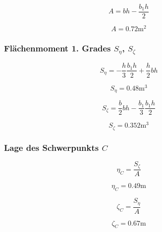 \documentclass[
  12pt,
  letterpaper,
  DIV=11,
  egregdoesnotlikesansseriftitles]{scrartcl}
\begin{document}
\begin{equation}A = b h - \frac{b_{1} h}{2}\end{equation}

\begin{equation}A = 0.72 \text{m}^{2}\end{equation}

\hypertarget{fluxe4chenmoment-1.-grades-s_eta-s_zeta}{%
\subsubsection{\texorpdfstring{Flächenmoment 1. Grades \(S_\eta\),
\(S_\zeta\)}{Flächenmoment 1. Grades S\_\textbackslash eta, S\_\textbackslash zeta}}\label{fluxe4chenmoment-1.-grades-s_eta-s_zeta}}

\begin{equation}S_{\eta} = - \frac{h}{3} \frac{b_{1} h}{2} + \frac{h}{2} b h\end{equation}

\begin{equation}S_{\eta} = 0.48 \text{m}^{3}\end{equation}

\begin{equation}S_{\zeta} = \frac{b}{2} b h - \frac{b_{1}}{3} \frac{b_{1} h}{2}\end{equation}

\begin{equation}S_{\zeta} = 0.352 \text{m}^{3}\end{equation}

\hypertarget{lage-des-schwerpunkts-c}{%
\subsubsection{\texorpdfstring{Lage des Schwerpunkts
\(C\)}{Lage des Schwerpunkts C}}\label{lage-des-schwerpunkts-c}}

\begin{equation}\eta_{C} = \frac{S_{\zeta}}{A}\end{equation}

\begin{equation}\eta_{C} = 0.49 \text{m}\end{equation}

\begin{equation}\zeta_{C} = \frac{S_{\eta}}{A}\end{equation}

\begin{equation}\zeta_{C} = 0.67 \text{m}\end{equation}
\end{document}
